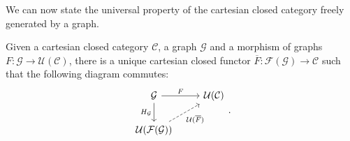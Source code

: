 We can now state the universal property of the cartesian closed category freely generated by a graph.

\begin{theorem}
    Given a cartesian closed category $\mathcal C$, a graph $\mathcal G$ and a morphism of graphs $F : \mathcal G \to \mathcal U(\mathcal C)$,
    there is a unique cartesian closed functor $\overline F : \mathcal F(\mathcal G) \to \mathcal C$ such that the following diagram commutes:
    \[\begin{tikzcd}
        {\mathcal G} & {\mathcal U(\mathcal C)} \\
        {\mathcal U(\mathcal F(\mathcal G))}
        \arrow["F", from=1-1, to=1-2]
        \arrow["{H_{\mathcal G}}"', from=1-1, to=2-1]
        \arrow["{\mathcal U(\overline F)}"', dashed, from=2-1, to=1-2]
    \end{tikzcd}.\]
\end{theorem}

